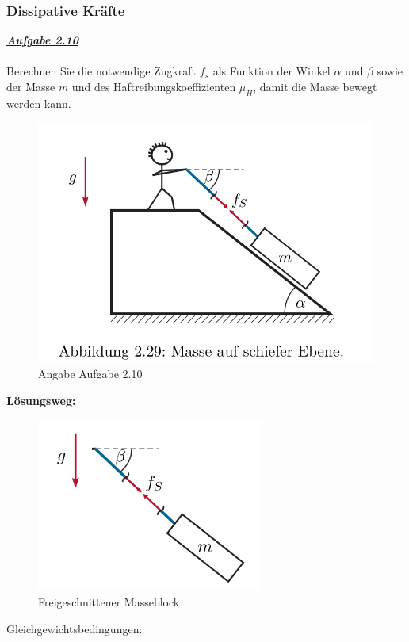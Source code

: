 \documentclass[a4paper,12p]{article}
\begin{document}
\subsubsection{Dissipative Kräfte }
\underline{\textbf{\textit{Aufgabe 2.10}}}\\ \\
Berechnen Sie die notwendige Zugkraft $f_{s}$ als Funktion der Winkel $\alpha$ und $\beta$ sowie der Masse $m$ und des Haftreibungskoeffizienten $\mu_{H}$, damit die Masse bewegt werden kann.
\begin{figure}[h]
	\begin{center}
		\includegraphics[width=10    cm]{pic/Angabe2_10}
		\caption{Angabe Aufgabe 2.10}
		\label{Angabe 2.10}
	\end{center}
\end{figure}
\newpage
\begin{flushleft}
	\textbf{Lösungsweg:}
\end{flushleft}
\begin{figure}[h]
	\begin{center}
		\includegraphics[width=7.5cm]{pic/Angabe2_10_2}
		\caption{Freigeschnittener Masseblock}
		\label{Loesung2.10}
	\end{center}
\end{figure}
Gleichgewichtsbedingungen:
\end{document}
